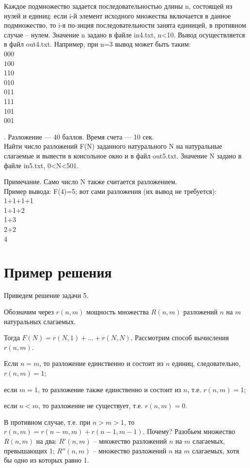 Каждое подмножество задается последовательностью длины n, состоящей из нулей и единиц: если i-й элемент исходного множества включается в данное подмножество, то i-я по-зиция последовательности занята единицей, в противном случае – нулем.
Значение n задано в файле in4.txt, n<10. Вывод осуществляется в файл out4.txt. Например, при n=3 вывод может быть таким:\\
000\\
100\\
110\\
010\\
011\\
111\\
101\\
001\\
\par{}. Разложение --- 40 баллов. Время счета --- 10 сек.\\
Найти число разложений F(N) заданного натурального N на натуральные слагаемые и вывести в консольное окно и в файл out5.txt. Значение N задано в файле in5.txt, 0<N<501.

Примечание. Само число N также считается разложением.\\
Пример вывода: F(4)=5; вот сами разложения (их вывод не требуется):\\
1+1+1+1\\
1+1+2\\
1+3\\
2+2\\
4\\
\section{Пример решения}
Приведем решение задачи 5.

Обозначим через $r(n,m)$ мощность множества $R(n,m)$ разложений $n$ на $m$ натуральных слагаемых.

Тогда $F(N) = r(N,1)+…+r(N,N)$.
Рассмотрим способ вычисления $r(n,m)$.

Если $n=m$, то разложение единственно и состоит из $n$ единиц, следовательно, $r(n,m)=1$;

если $m=1$, то разложение также единственно и состоит из $n$, т.е. $r(n,m)=1$;

если $n<m$, то разложение не существует, т.е. $r(n,m)=0$.

В противном случае, т.е. при $n>m>1$, то
$r(n,m)= r(n-m, m) + r(n-1, m-1)$. Почему?
Разобьем множество $R(n,m)$ на два:
$R'(n,m)$ -- множество разложений $n$ на $m$ слагаемых, превышающих 1;
$R''(n,m)$ -- множество разложений $n$ на $m$ слагаемых, хотя бы одно из которых равно 1.

